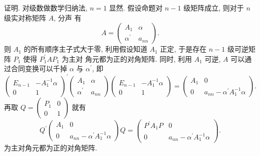 \documentclass{article}
\begin{document}
{\heiti 证明.} 对级数做数学归纳法, $n=1$ 显然. 假设命题对 $n-1$ 级矩阵成立, 则对于 $n$ 级实对称矩阵 $A$, 分声
有
\begin{equation*}
    A=\left(\begin{array}{cc}
        A_{1}           & \alpha  \\
        \alpha^{\prime} & a_{n n}
    \end{array}\right).
\end{equation*}
则 $A_{1}$ 的所有顺序主子式大于零, 利用假设知道 $A_{1}$ 正定, 于是存在 $n-1$ 级可逆矩阵 $P_{1}$ 使得 $P_{1}^{\prime} A P_{1}$ 为主对 角元都为正的对角矩阵. 同时, 利用 $A_{1}$ 可逆, $A$ 可以通过合同变换可以千掉 $\alpha$ 与 $\alpha^{\prime}$, 即
\begin{equation*}
    \left(\begin{array}{cc}
        E_{n-1} & -A_{1}^{-1} \alpha \\
        0       & 1
    \end{array}\right)^{\prime}\left(\begin{array}{cc}
            A_{1}           & \alpha  \\
            \alpha^{\prime} & a_{n n}
        \end{array}\right)\left(\begin{array}{cc}
            E_{n-1} & -A_{1}^{-1} \alpha \\
            0       & 1
        \end{array}\right)=\left(\begin{array}{cc}
            A_{1} & 0                                         \\
            0     & a_{n n}-\alpha^{\prime} A_{1}^{-1} \alpha
        \end{array}\right).
\end{equation*}
再取 $Q=\left(\begin{array}{cc}P_{1} & 0 \\ 0 & 1\end{array}\right)$ 就有
\begin{equation*}
    Q^{\prime}\left(\begin{array}{cc}
            A_{1} & 0                                         \\
            0     & a_{n n}-\alpha^{\prime} A_{1}^{-1} \alpha
        \end{array}\right) Q=\left(\begin{array}{cc}
            P^{\prime} A_{1} P & 0                                         \\
            0                  & a_{n n}-\alpha^{\prime} A_{1}^{-1} \alpha
        \end{array}\right).
\end{equation*}
为主对角元都为正的对角矩阵.
\end{document}
